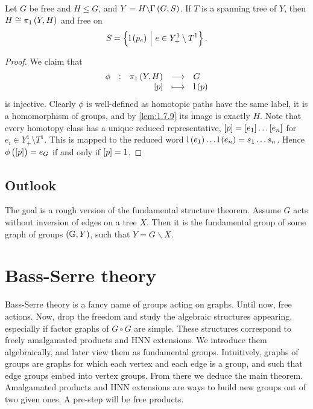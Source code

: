 \begin{theorem}
Let $ G $ be free and $ H \le G $, and $ Y = H \backslash \Gamma\br{G, S} $. If $ T $ is a spanning tree of $ Y $, then $ H \cong \pi_1\br{Y, H} $ and free on
$$ S = \cbr{\l\br{p_e} \st e \in Y_+^1 \setminus T^1}. $$
\end{theorem}

\begin{proof}
We claim that
$$ \function[\phi]{\pi_1\br{Y, H}}{G}{\sbr{p}}{\l\br{p}} $$
is injective. Clearly $ \phi $ is well-defined as homotopic paths have the same label, it is a homomorphism of groups, and by \ref{lem:1.7.9} its image is exactly $ H $. Note that every homotopy class has a unique reduced representative, $ \sbr{p} = \sbr{e_1} \dots \sbr{e_n} $ for $ e_i \in Y_+^1 \setminus T^1 $. This is mapped to the reduced word $ \l\br{e_1} \dots \l\br{e_n} = s_1 \dots s_n $. Hence $ \phi\br{\sbr{p}} = e_G $ if and only if $ \sbr{p} = 1 $.
\end{proof}

\subsection{Outlook}


The goal is a rough version of the fundamental structure theorem. Assume $ G $ acts without inversion of edges on a tree $ X $. Then it is the fundamental group of some graph of groups $ \br{\GG, Y} $, such that $ Y = G \backslash X $.

\pagebreak

\section{Bass-Serre theory}

Bass-Serre theory is a fancy name of groups acting on graphs. Until now, free actions. Now, drop the freedom and study the algebraic structures appearing, especially if factor graphs of $ G \circ G $ are simple. These structures correspond to freely amalgamated products and HNN extensions. We introduce them algebraically, and later view them as fundamental groups. Intuitively, graphs of groups are graphs for which each vertex and each edge is a group, and such that edge groups embed into vertex groups. From there we deduce the main theorem. Amalgamated products and HNN extensions are ways to build new groups out of two given ones. A pre-step will be free products.

